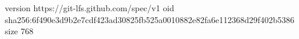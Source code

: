 version https://git-lfs.github.com/spec/v1
oid sha256:6f490e3d9b2e7cdf423ad30825fb525a0010882e82fa6e112368d29f402b5386
size 768

